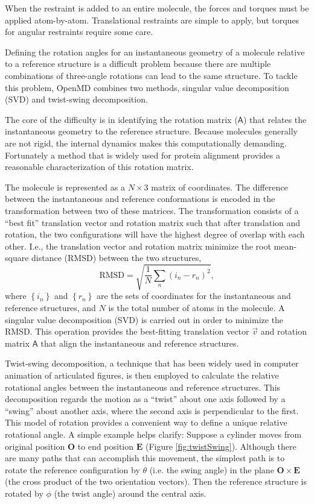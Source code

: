 \documentclass[]{book}
\begin{document}
When the restraint is added to an entire molecule, the forces and
torques must be applied atom-by-atom. Translational restraints are
simple to apply, but torques for angular restraints require some
care. 

Defining the rotation angles for an instantaneous geometry of a
molecule relative to a reference structure is a difficult problem
because there are multiple combinations of three-angle rotations can
lead to the same structure. To tackle this problem, OpenMD combines
two methods, singular value decomposition (SVD) and twist-swing
decomposition.

The core of the difficulty is in identifying the rotation matrix
($\mathsf{A}$) that relates the instantaneous geometry to the
reference structure.  Because molecules generally are not rigid, the
internal dynamics makes this computationally demanding. Fortunately a
method that is widely used for protein alignment provides a reasonable
characterization of this rotation matrix.

The molecule is represented as a $N \times 3$ matrix of coordinates.
The difference between the instantaneous and reference conformations
is encoded in the transformation between two of these matrices.  The
transformation consists of a ``best fit'' translation vector and
rotation matrix such that after translation and rotation, the two
configurations will have the highest degree of overlap with each
other.  I.e., the translation vector and rotation matrix minimize the
root mean-square distance (RMSD) between the two structures,
\begin{equation}
  \mathrm{RMSD} = \sqrt{\frac{1}{N} \sum_n \left(i_n - r_n\right)^2 },
\end{equation}
where $\left\{i_n\right\}$ and $\left\{r_n\right\}$ are the sets of
coordinates for the instantaneous and reference structures, and $N$ is
the total number of atoms in the molecule.  A singular value
decomposition (SVD) is carried out in order to minimize the RMSD.
This operation provides the best-fitting translation vector $\vec{v}$
and rotation matrix $\mathsf{A}$ that align the instantaneous and
reference structures.

Twist-swing decomposition, a technique that has been widely used in
computer animation of articulated figures, is then employed to
calculate the relative rotational angles between the instantaneous and
reference structures.  This decomposition regards the motion as a
``twist'' about one axis followed by a ``swing'' about another axis,
where the second axis is perpendicular to the
first.\cite{Kallmann:2008fk,Shoemake:1994uq} This model of rotation
provides a convenient way to define a unique relative rotational
angle.  A simple example helps clarify: Suppose a cylinder moves from
original position $\mathbf{O}$ to end position $\mathbf{E}$ (Figure
\ref{fig:twistSwing}).  Although there are many paths that can
accomplish this movement, the simplest path is to rotate the reference
configuration by $\theta$ (i.e. the swing angle) in the plane
$\mathbf{O} \times \mathbf{E}$ (the cross product of the two
orientation vectors).  Then the reference structure is rotated by
$\phi$ (the twist angle) around the central axis.
\end{document}
